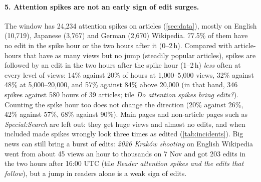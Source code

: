 \paragraph{5. Attention spikes are not an early sign of edit surges.} The window has 24{,}234
attention spikes on articles (\cref{sec:data}), mostly on English (10{,}719), Japanese (3{,}767) and German
(2{,}670) Wikipedia. 77.5\% of them have no edit in the spike hour or the two hours after it (0--2\,h).
Compared with article-hours that have as many views but no jump (steadily popular articles), spikes are
followed by an edit in the two hours after the spike hour (1--2\,h) \emph{less} often at every level of
views: 14\%
against 20\% of hours at 1{,}000--5{,}000 views, 32\% against 48\% at 5{,}000--20{,}000, and 57\% against
84\% above 20{,}000 (in that band, 346 spikes against 580 hours of 39 articles; tile \emph{Do attention spikes bring
edits?}). Counting the spike hour too does not change the direction (20\% against 26\%, 42\% against
57\%, 68\% against 90\%). Main pages and non-article pages such as
\emph{Special:Search} are left out: they get huge views and almost no edits, and when included made spikes
wrongly look three times as edited (\cref{tab:incidents}). Big news can still bring a burst of edits: \emph{2026 Kraków shooting} on English Wikipedia went from about 45 views an
hour to thousands on 7 Nov and got 203 edits in the two hours after 16:00 UTC (tile \emph{Reader attention
spikes and the edits that follow}), but a jump in readers alone is a weak sign of edits.
